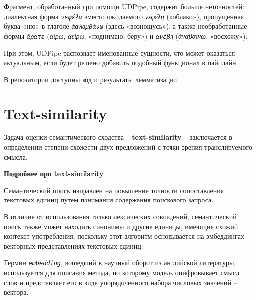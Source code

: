 \documentclass[
  letterpaper,
]{book}
\begin{document}
Фрагмент, обработанный при помощи UDPipe, содержит больше неточностей:
диалектная форма \emph{\texttt{νεφέλα}} вместо ожидаемого \emph{νεφέλη}
(«облако»), пропущенная буква «ню» в глаголе \emph{\texttt{ἀαλαμβάνω}}
(здесь «возношусь»), а также необработанные формы \emph{\texttt{ἄρατε}}
(\emph{αἴρω}, \emph{ἀείρω}, «поднимаю, беру») и \emph{\texttt{ἀνέβη}}
(\emph{ἀναβαίνω}, «восхожу»).

При этом, UDPipe распознает именованные сущности, что может оказаться
актуальным, если будет решено добавить подобный функционал в пайплайн.

В репозитории доступны
\href{https://github.com/Drozhzhinastya/GSPC/tree/main/scripts/lemmatization}{код}
и
\href{https://github.com/Drozhzhinastya/GSPC/tree/main/lemmatization/greek}{результаты}
лемматизации.


\hypertarget{sec-about_txt_similarity}{%
\chapter{Text-similarity}\label{sec-about_txt_similarity}}

Задача оценки семантического сходства -- \textbf{text-similarity} --
заключается в определении степени схожести двух предложений с точки
зрения транслируемого смысла.

\begin{tcolorbox}[enhanced jigsaw, colframe=quarto-callout-note-color-frame, rightrule=.15mm, breakable, arc=.35mm, left=2mm, colback=white, bottomrule=.15mm, toprule=.15mm, leftrule=.75mm, opacityback=0]

\textbf{Подробнее про text-similarity}\vspace{2mm}

Семантический поиск направлен на повышение точности сопоставления
текстовых единиц путем понимания содержания поискового запроса.

В отличие от использования только лексических совпадений, семантический
поиск также может находить синонимы и другие единицы, имеющие схожий
контекст употребления, поскольку этот алгоритм основывается на
эмбеддингах -- векторных представлениях текстовых единиц.

Термин \emph{\texttt{embedding}}, вошедший в научный оборот из
английской литературы, используется для описания метода, по которому
модель оцифровывает смысл слов и представляет его в виде упорядоченного
набора числовых значений -- вектора.

\end{tcolorbox}
\end{document}
